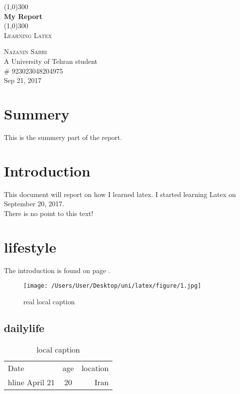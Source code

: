 \documentclass{article}
\begin{document}
\begin{titlepage}
	\begin{center}

	\line(1,0){300}\\
	[0.25in]
	\huge{\bfseries My Report}\\
	[2mm]
	\line(1,0){300}\\
	[0.75cm]
	\textsc{\large Learning Latex}\\
	[10cm]
	\end{center}

	\begin{flushright}
	\textsc{\large Nazanin Sabri\\}
	A University of Tehran student\\
	\# 923023048204975\\
	Sep 21, 2017
	\end{flushright}

\end{titlepage}


\section*{Summery}
This is the summery part of the report. 
\cleardoublepage


\tableofcontents
\thispagestyle{empty}
\cleardoublepage



\listoftables
{}
\cleardoublepage



\setcounter{page}{1}

\section{Introduction}\label{sec:intro}
This document will report on how I learned latex. I started learning Latex on September 20, 2017.\\ There is no point to this text!\\
\lipsum[1]

\newpage
\section{lifestyle}\label{sec:lifestyle}
The introduction is found on page \pageref{sec:intro}.


\lipsum[2]
\begin{figure}
	\centering 
	\texttt{[image: /Users/User/Desktop/uni/latex/figure/1.jpg]}
	\caption[Optional caption]{real local caption}
\end{figure}


\subsection{dailylife}
\lipsum[1]



\begin{table}[H]
	\centering 
	\label{tab:thisIsMyTable}
	\caption[this is optional caption, without refrencing]{local caption}
	\begin{tabular}{l c r}
		Date & age & location \\hline
		April 21 & 20 & Iran \\
	\end{tabular}
\end{table}
\end{document}
